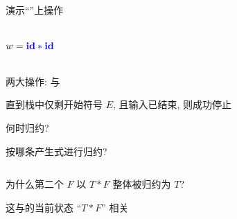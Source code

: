 \begin{frame}{}
  \begin{center}
    演示``''上操作

    \begin{columns}
        

        \vspace{-0.80cm}
        \[
          w = \textcolor{blue}{\text{\bf id} \ast \text{\bf id}}
        \]
    \end{columns}

    \vspace{0.60cm}
    两大操作:  与 

    \vspace{0.30cm}
    直到栈中仅剩开始符号 $E$, 且输入已结束, 则成功停止
  \end{center}
\end{frame}

\begin{frame}{}
  \begin{center}

    \vspace{0.80cm}
     何时归约? 

    \vspace{0.80cm}
     按哪条产生式进行归约?
  \end{center}
\end{frame}

\begin{frame}{}
  \begin{center}

    \begin{columns}
        
    \end{columns}

    \vspace{0.50cm}
    为什么第二个 $F$ 以 $T \ast F$ 整体被归约为 $T$?

    \vspace{0.30cm}
    这与的当前状态 ``$T \ast F$'' 相关
  \end{center}
\end{frame}

